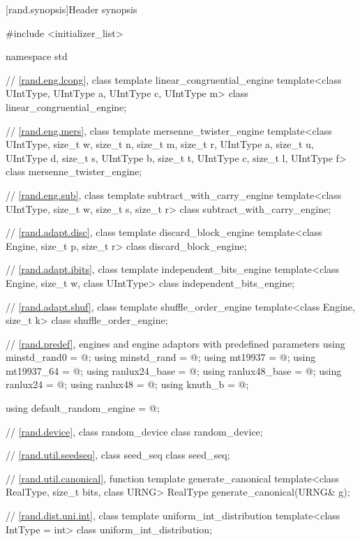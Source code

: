 [rand.synopsis]{Header  synopsis}%
%

\begin{codeblock}
#include <initializer_list>

namespace std {

 // \ref{rand.eng.lcong}, class template linear_congruential_engine
 template<class UIntType, UIntType a, UIntType c, UIntType m>
   class linear_congruential_engine;

 // \ref{rand.eng.mers}, class template mersenne_twister_engine
 template<class UIntType, size_t w, size_t n, size_t m, size_t r,
          UIntType a, size_t u, UIntType d, size_t s,
          UIntType b, size_t t,
          UIntType c, size_t l, UIntType f>
   class mersenne_twister_engine;

 // \ref{rand.eng.sub}, class template subtract_with_carry_engine
 template<class UIntType, size_t w, size_t s, size_t r>
   class subtract_with_carry_engine;

 // \ref{rand.adapt.disc}, class template discard_block_engine
 template<class Engine, size_t p, size_t r>
   class discard_block_engine;

 // \ref{rand.adapt.ibits}, class template independent_bits_engine
 template<class Engine, size_t w, class UIntType>
   class independent_bits_engine;

 // \ref{rand.adapt.shuf}, class template shuffle_order_engine
 template<class Engine, size_t k>
   class shuffle_order_engine;

 // \ref{rand.predef}, engines and engine adaptors with predefined parameters
 using minstd_rand0  = @\seebelow@;
 using minstd_rand   = @\seebelow@;
 using mt19937       = @\seebelow@;
 using mt19937_64    = @\seebelow@;
 using ranlux24_base = @\seebelow@;
 using ranlux48_base = @\seebelow@;
 using ranlux24      = @\seebelow@;
 using ranlux48      = @\seebelow@;
 using knuth_b       = @\seebelow@;

 using default_random_engine = @\seebelow@;

 // \ref{rand.device}, class random_device
 class random_device;

 // \ref{rand.util.seedseq}, class seed_seq
 class seed_seq;

 // \ref{rand.util.canonical}, function template generate_canonical
 template<class RealType, size_t bits, class URNG>
   RealType generate_canonical(URNG& g);

 // \ref{rand.dist.uni.int}, class template uniform_int_distribution
 template<class IntType = int>
   class uniform_int_distribution;

}
\end{codeblock}

